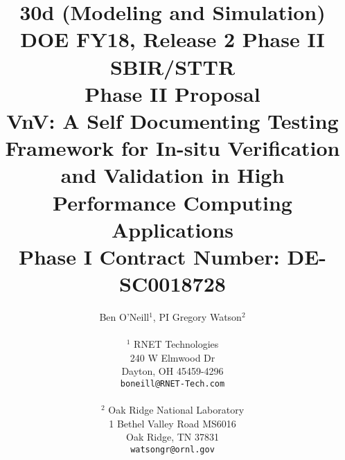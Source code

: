 \title{30d (Modeling and Simulation)\\
DOE FY18, Release 2 Phase II SBIR/STTR \\
\vspace{0.25in}Phase II Proposal\\
\vspace{0.25in} VnV: A Self Documenting Testing Framework for In-situ Verification and Validation in High Performance Computing Applications\\
Phase I Contract Number: DE-SC0018728\\
\vspace{0.15in}}
\author{Ben O'Neill$^1$, PI \hspace{0.75in} Gregory Watson$^2$\\
  \\$^1$ RNET Technologies\\
  240 W Elmwood Dr\\
  Dayton, OH 45459-4296\\
  {\tt boneill@RNET-Tech.com}\\\\
  $^2$ Oak Ridge National Laboratory\\
  1 Bethel Valley Road MS6016\\
  Oak Ridge, TN 37831\\
  {\tt watsongr@ornl.gov}
}


